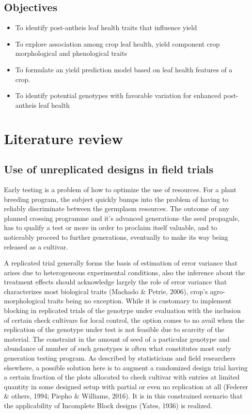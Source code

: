 \documentclass[12pt,oneside]{dukestatscithesis} %
\providecommand{\tightlist}{%
  \setlength{\itemsep}{0pt}\setlength{\parskip}{0pt}}
\begin{document}
\hypertarget{objectives}{%
\section{Objectives}\label{objectives}}
\begin{itemize}
\tightlist
\item
  To identify post-antheis leaf health traits that influence yield
\item
  To explore association among crop leaf health, yield component crop morphological and phenological traits
\item
  To formulate an yield prediction model based on leaf health features of a crop.
\item
  To identify potential genotypes with favorable variation for enhanced post-antheis leaf health
\end{itemize}
\hypertarget{literature-review}{%
\chapter{Literature review}\label{literature-review}}

\hypertarget{unrep-designs}{%
\section{Use of unreplicated designs in field trials}\label{unrep-designs}}

Early testing is a problem of how to optimize the use of resources. For a plant breeding program, the subject quickly bumps into the problem of having to reliably discriminate between the germplasm resources. The outcome of any planned crossing programme and it's advanced generations--the seed propagule, has to qualify a test or more in order to proclaim itself valuable, and to noticeably proceed to further generations, eventually to make its way being released as a cultivar.

A replicated trial generally forms the basis of estimation of error variance that arises due to heterogeneous experimental conditions, also the inference about the treatment effects should acknowledge largely the role of error variance that characterizes most biological traits (Machado \& Petrie, 2006), crop's agro-morphological traits being no exception. While it is customary to implement blocking in replicated trials of the genotype under evaluation with the inclusion of certain check cultivars for local control, the option comes to no avail when the replication of the genotype under test is not feasible due to scarcity of the material. The constraint in the amount of seed of a particular genotype and abundance of number of such genotypes is often what constitutes most early generation testing program. As described by statisticians and field researchers elsewhere, a possible solution here is to augment a randomized design trial having a certain fraction of the plots allocated to check cultivar with entries at limited quantity in some designed setup with partial or even no replication at all (Federer \& others, 1994; Piepho \& Williams, 2016). It is in this constrained scenario that the applicability of Incomplete Block designs (Yates, 1936) is realized.
\end{document}
